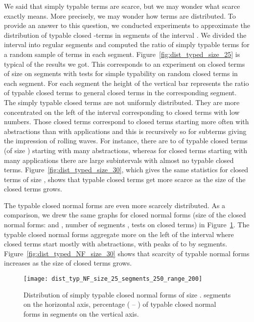 \documentclass{jfp1}
\begin{document}
We said that simply typable terms are scarce, but we may wonder what scarce exactly
means.  More precisely, we may wonder how terms are distributed.  To provide an
answer to this question, we conducted experiments to approximate the distribution of
typable closed -terms  in segments of the interval . We divided the
interval into regular segments and computed the ratio of simply typable terms
for a random sample of terms in each segment. 
Figure~\ref{fig:dist_typed_size_25} is typical of the results we got.  This
corresponds to an experiment on closed terms of size  on  segments with tests for
simple typability on  random closed terms in each segment.  For each segment the height
of the vertical bar represents the ratio of typable closed terms to general closed terms in the corresponding
segment.   The simply typable closed terms are not uniformly distributed.  They
are more concentrated on the left of the interval corresponding to closed terms with low
numbers.  Those closed terms correspond to closed terms starting more often with abstractions than
with applications and this is recursively so for subterms giving the impression of
rolling waves.  For instance, there are  to  of typable closed terms (of size
) starting with many abstractions, whereas for closed terms starting with many
applications there are large subintervals with almost no typable closed terms.
Figure~\ref{fig:dist_typed_size_30}, which gives the same statistics for closed terms of
size , shows that typable closed terms get more scarce as the size of the closed terms grows.


The typable closed normal forms are even more scarcely distributed. As a comparison,
we drew the same graphs for closed normal forms (size of the closed normal forms:
 and , number of segments , tests on  closed terms) in
Figure~\ref{fig:dist_typed_NF_size_25}.  The typable closed normal forms aggregate
more on the left of the interval where closed terms start mostly with abstractions,
with peaks of  to  by segments.  Figure~\ref{fig:dist_typed_NF_size_30}
shows that scarcity of typable normal forms increases as the size of closed terms grows.

\begin{figure}[htb!]
  \centering
   \texttt{[image: dist\_typ\_NF\_size\_25\_segments\_250\_range\_200]}
  \ifJFP
\else
\\\centerline{}
\fi
  \caption{Distribution of simply typable closed normal forms  of size \textbf{}.  segments on the
    horizontal axis, percentage ( -- ) of typable closed normal forms in segments on the vertical axis.}
  \label{fig:dist_typed_NF_size_25}
\end{figure}
\end{document}
